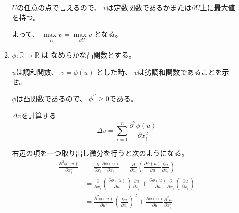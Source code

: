 \documentclass[12pt,b5paper]{ltjsarticle}
\begin{document}
\begin{enumerate}
\begin{enumerate}
            $U$の任意の点で言えるので、
            $v$は定数関数であるかまたは$\partial U$上に最大値を持つ。

            よって、
            $\underset{\overline{U}}{\max {v}} = \underset{\partial{U}}{\max {v}}$
            となる。


            \hrulefill

       \item

            $\phi : \mathbb{R}\to\mathbb{R}$
            は
            なめらかな凸関数とする。

            $u$は調和関数、
            $v = \phi(u)$
            とした時、
            $v$は劣調和関数であることを示せ。

            \dotfill

            $\phi$は凸関数であるので、
            $\phi^{\prime\prime} \geq 0$である。

            $\Delta v$を計算する
            \begin{equation}
             \Delta v = \sum_{i=1}^{n} \frac{\partial^{2} \phi(u)}{\partial x_{i}^{2}}
            \end{equation}

            右辺の項を一つ取り出し微分を行うと次のようになる。
            \begin{align}
             \frac{\partial^{2} \phi(u)}{\partial x_{i}^{2}}
              &= \frac{\partial}{\partial x_{i}} \frac{\partial \phi(u)}{\partial x_{i}}
              = \frac{\partial}{\partial x_{i}} \left( \frac{\partial \phi(u)}{\partial u}\frac{\partial u}{\partial x_{i}} \right)\\
              &= \frac{\partial}{\partial x_{i}} \left( \frac{\partial \phi(u)}{\partial u} \right) \frac{\partial u}{\partial x_{i}}
               + \frac{\partial \phi(u)}{\partial u} \frac{\partial}{\partial x_{i}} \left( \frac{\partial u}{\partial x_{i}} \right)\\
              &= \frac{\partial^{2} \phi(u)}{\partial u^{2}} \left( \frac{\partial u}{\partial x_{i}} \right)^{2}
               + \frac{\partial \phi(u)}{\partial u} \frac{\partial^{2} u}{\partial x_{i}^{2}}
            \end{align}


\end{enumerate}
\end{enumerate}
\end{document}
